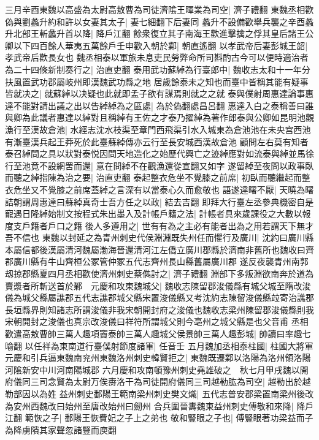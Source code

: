 三月辛酉東魏以高盛為太尉高敖曹為司徒濟隂王暉業為司空|{
	濟子禮翻}
東魏丞相歡偽與劉蠡升約和許以女妻其太子|{
	妻七細翻下后妻同}
蠡升不設備歡舉兵襲之辛酉蠡升北部王斬蠡升首以降|{
	降戶江翻}
餘衆復立其子南海王歡進擊擒之俘其皇后諸王公卿以下四百餘人華夷五萬餘戶壬申歡入朝於鄴|{
	朝直遙翻}
以孝武帝后妻彭城王韶|{
	孝武帝后歡長女也}
魏丞相泰以軍旅未息吏民勞弊命所司斟酌古今可以便時適治者為二十四條新制奏行之|{
	治直吏翻}
泰用武功蘇綽為行臺郎中|{
	魏收志太和十一年分扶風置武功郡屬岐州即漢魏武功縣之地}
居歲餘泰未之知也而臺中皆稱其能有疑事皆就决之|{
	就蘇綽以决疑也此就即孟子欲有謀焉則就之之就}
泰與僕射周惠達論事惠達不能對請出議之出以告綽綽為之區處|{
	為於偽翻處昌呂翻}
惠達入白之泰稱善曰誰與卿為此議者惠達以綽對且稱綽有王佐之才泰乃擢綽為著作郎泰與公卿如昆明池觀漁行至漢故倉池|{
	水經志沈水枝渠至章門西飛渠引水入城東為倉池池在未央宫西池有漸臺漢兵起王莽死於此臺蘇綽傳亦云行至長安城西漢故倉池}
顧問左右莫有知者泰召綽問之具以狀對泰悦因問天地造化之始歷代興亡之迹綽應對如流泰與綽並馬徐行至池竟不設網罟而還|{
	意在問綽不在觀漁還從宣翻又如字}
遂留綽至夜問以政事臥而聽之綽指陳為治之要|{
	治直吏翻}
泰起整衣危坐不覺膝之前席|{
	初臥而聽繼起而整衣危坐又不覺膝之前席蓋綽之言深有以當泰心久而愈敬也}
語遂達曙不厭|{
	天曉為曙}
詰朝謂周惠達曰蘇綽真奇士吾方任之以政|{
	結去吉翻}
即拜大行臺左丞參典機密自是寵遇日隆綽始制文按程式朱出墨入及計帳戶籍之法|{
	計帳者具來歲課役之大數以報度支戶籍者戶口之籍}
後人多遵用之|{
	世有有為之主必有能者出為之用若謂天下無才吾不信也}
東魏以封延之為青州刺史代侯淵淵既失州任而懼行及廣川|{
	沈約曰廣川縣本屬信都後漢屬清河魏屬渤海晉還清河江左僑立廣川郡縣於濟南非舊所也魏收曰齊郡廣川縣有牛山齊桓公冢管仲冢五代志齊州長山縣舊屬廣川郡}
遂反夜襲青州南郭刼掠郡縣夏四月丞相歡使濟州刺史蔡儁討之|{
	濟子禮翻}
淵部下多叛淵欲南奔於道為賣漿者所斬送首於鄴　元慶和攻東魏城父|{
	魏收志陳留郡浚儀縣有城父城至隋改浚儀為城父縣屬譙郡五代志譙郡城父縣宋置浚儀縣又考沈約志陳留浚儀縣竝寄治譙郡長垣縣界則知諸志所謂浚儀非我宋朝開封府之浚儀也魏收志梁州陳留郡浚儀縣則我宋朝開封之浚儀也真宗改浚儀曰祥符所謂城父則今亳州之城父縣是也父音甫}
丞相歡遣高敖曹帥三萬人趣項竇泰帥三萬人趣城父侯景帥三萬人趣彭城|{
	帥讀曰率趣七喻翻}
以任祥為東南道行臺僕射節度諸軍|{
	任音壬}
五月魏加丞相泰柱國|{
	柱國大將軍}
元慶和引兵逼東魏南兖州東魏洛州刺史韓賢拒之|{
	東魏既遷鄴以洛陽為洛州領洛陽河隂新安中川河南陽城郡}
六月慶和攻南頓豫州刺史堯雄破之　秋七月甲戌魏以開府儀同三司念賢為太尉万俟夀洛干為司徒開府儀同三司越勒肱為司空|{
	越勒出於越勒部因以為姓}
益州刺史鄱陽王範南梁州刺史樊文熾|{
	五代志普安郡梁置南梁州後改為安州西魏改曰始州至唐改始州曰劒州}
合兵圍晉夀魏東益州刺史傅敬和來降|{
	降戶江翻}
範恢之子|{
	鄱陽王恢費妃之子上之弟也}
敬和豎眼之子也|{
	傅豎眼著功梁益而子為降虜隤其家聲忽諸豎而庾翻}
